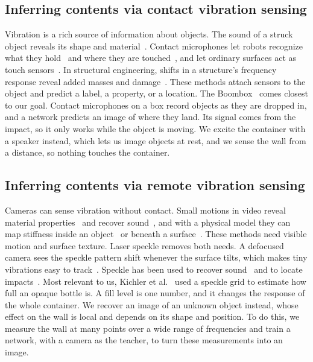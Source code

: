 \subsection{Inferring contents via contact vibration sensing}
Vibration is a rich source of information about objects.
The sound of a struck object reveals its shape and material~\cite{zhang2017shape,gao2023objectfolder,clarke2023realimpact}.
Contact microphones let robots recognize what they hold~\cite{liu2024sonicsense} and where they are touched~\cite{zaielamri2026vibrosense}, and let ordinary surfaces act as touch sensors~\cite{liu2017vibsense,iravantchi2023sawsense}.
In structural engineering, shifts in a structure's frequency response reveal added masses and damage~\cite{dackermann2013identification,ostachowicz2002location,azuara2021damage}.
These methods attach sensors to the object and predict a label, a property, or a location.
The Boombox~\cite{chen2021boombox} comes closest to our goal.
Contact microphones on a box record objects as they are dropped in, and a network predicts an image of where they land.
Its signal comes from the impact, so it only works while the object is moving.
We excite the container with a speaker instead, which lets us image objects at rest, and we sense the wall from a distance, so nothing touches the container.

\subsection{Inferring contents via remote vibration sensing}
Cameras can sense vibration without contact.
Small motions in video reveal material properties~\cite{bouman2013estimating,davis2015visual} and recover sound~\cite{davis2014visual}, and with a physical model they can map stiffness inside an object~\cite{feng2022visual} or beneath a surface~\cite{ogren2025visual}.
These methods need visible motion and surface texture.
Laser speckle removes both needs.
A defocused camera sees the speckle pattern shift whenever the surface tilts, which makes tiny vibrations easy to track~\cite{zalevsky2009simultaneous}.
Speckle has been used to recover sound~\cite{sheinin2022dual,cai2025event2audio,bagon2026drum} and to locate impacts~\cite{zhang2023analyzing}.
Most relevant to us, Kichler et al.~\cite{kichler2025learning} used a speckle grid to estimate how full an opaque bottle is.
A fill level is one number, and it changes the response of the whole container.
We recover an image of an unknown object instead, whose effect on the wall is local and depends on its shape and position.
To do this, we measure the wall at many points over a wide range of frequencies and train a network, with a camera as the teacher, to turn these measurements into an image.


